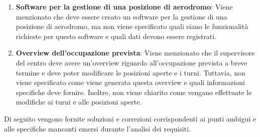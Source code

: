 \begin{enumerate}
  \item \textbf{Software per la gestione di una posizione di aerodromo}: Viene menzionato che deve essere creato un software per la gestione di una posizione di aerodromo, ma non viene specificato quali siano le funzionalità richieste per questo software e quali dati devono essere registrati.
  
  \item \textbf{Overview dell'occupazione prevista}: Viene menzionato che il supervisore del centro deve avere un'overview riguardo all'occupazione prevista a breve termine e deve poter modificare le posizioni aperte e i turni. Tuttavia, non viene specificato come viene generata questa overview e quali informazioni specifiche deve fornire. Inoltre, non viene chiarito come vengano effettuate le modifiche ai turni e alle posizioni aperte.
  \end{enumerate}

Di seguito vengono fornite soluzioni e correzioni corrispondenti ai punti ambigui e alle specifiche mancanti emersi durante l'analisi dei requisiti.

